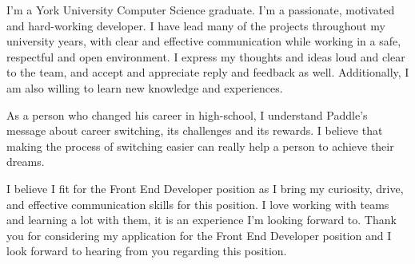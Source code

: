 \documentclass[11pt, a4paper]{awesome-cv}
\begin{document}
\makecvheader[R]

\makecvfooter
  {}
  {}
  {}

\makelettertitle

\begin{cvletter}

I'm a York University Computer Science graduate. I'm a passionate, motivated and hard-working developer. I have lead many of  the projects throughout my university years, with clear and effective communication while working in a safe, respectful and open environment. I express my thoughts and ideas loud and clear to the team, and accept and appreciate reply and feedback as well. Additionally, I am also willing to learn new knowledge and experiences.

As a person who changed his career in high-school, I understand Paddle's message about career switching, its challenges and its rewards. I believe that making the process of switching easier can really help a person to achieve their dreams.

I believe I fit for the Front End Developer position as I bring my curiosity, drive, and effective communication skills for this position. I love working with teams and learning a lot with them, it is an experience I'm looking forward to. Thank you for considering my application for the Front End Developer position and I look forward to hearing from you regarding this position.

\end{cvletter}


\makeletterclosing
\end{document}
